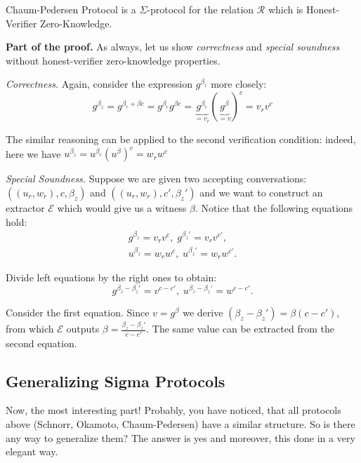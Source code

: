 \documentclass[../lecture-notes.tex]{subfiles}
\begin{document}
\begin{theorem}
    Chaum-Pedersen Protocol is a $\Sigma$-protocol for the relation $\mathcal{R}$ which is Honest-Verifier Zero-Knowledge.
\end{theorem}

\textbf{Part of the proof.} As always, let us show \textit{correctness} and \textit{special soundness} without honest-verifier zero-knowledge properties.

\textit{Correctness.} Again, consider the expression $g^{\beta_z}$ more closely:
\begin{equation*}
    g^{\beta_z} = g^{\beta_r + \beta c} = g^{\beta_r}g^{\beta c} = \underbrace{g^{\beta_r}}_{=v_r}(\underbrace{g^{\beta}}_{=v})^c = v_rv^c
\end{equation*}

The similar reasoning can be applied to the second verification condition: indeed, here we have $u^{\beta_z} = u^{\beta_r}(u^{\beta})^c = w_rw^c$

\textit{Special Soundness.} Suppose we are given two accepting conversations: $((u_r,w_r),c,\beta_z)$ and $((u_r,w_r),c',\beta_z')$ and we want to construct an extractor $\mathcal{E}$ which would give us a witness $\beta$. Notice that the following equations hold:
\begin{align*}
    g^{\beta_z} = v_rv^c, \; g^{\beta_z'} = v_rv^{c'}, \\ u^{\beta_z} = w_rw^c, \; u^{\beta_z'} = w_rw^{c'}.
\end{align*}

Divide left equations by the right ones to obtain:
\begin{equation*}
    g^{\beta_z - \beta_z'} = v^{c-c'}, \; u^{\beta_z - \beta_z'} = w^{c-c'}.
\end{equation*}

Consider the first equation. Since $v=g^{\beta}$ we derive $(\beta_z-\beta_z') = \beta(c-c')$, from which $\mathcal{E}$ outputs $\beta = \frac{\beta_z-\beta_z'}{c-c'}$. The same value can be extracted from the second equation.

\subsection{Generalizing Sigma Protocols}

Now, the most interesting part! Probably, you have noticed, that all protocols above (Schnorr, Okamoto, Chaum-Pedersen) have a similar structure. So is there any way to generalize them? The answer is yes and moreover, this done in a very elegant way.
\end{document}
